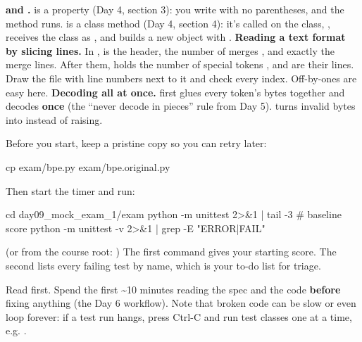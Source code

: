 \documentclass[10pt,a4paper]{article}
\begin{document}
\textbf{ and .}  is a property (Day 4, section 3): you write  with no parentheses, and the method runs.  is a class method (Day 4, section 4): it’s called on the class, , receives the class as , and builds a new object with .
\textbf{Reading a text format by slicing lines.} In ,  is the header,  the number of merges , and  exactly the  merge lines. After them,  holds the number of special tokens , and  are their lines. Draw the file with line numbers next to it and check every index. Off-by-ones are easy here.
\textbf{Decoding all at once.}  first glues every token’s bytes together and decodes \textbf{once} (the “never decode in pieces” rule from Day 5).  turns invalid bytes into  instead of raising.
\begin{tipbox}
Before you start, keep a pristine copy so you can retry later:
\end{tipbox}
\begin{shcode}
cp exam/bpe.py exam/bpe.original.py
\end{shcode}
Then start the timer and run:
\begin{shcode}
cd day09_mock_exam_1/exam
python -m unittest 2>&1 | tail -3              # baseline score
python -m unittest -v 2>&1 | grep -E "ERROR|FAIL"
\end{shcode}
(or from the course root: )
The first command gives your starting score. The second lists every failing test by name, which is your to-do list for triage.
\begin{tipbox}
Read  first. Spend the first \textasciitilde{}10 minutes reading the spec and the code \textbf{before} fixing anything (the Day 6 workflow). Note that broken code can be slow or even loop forever: if a test run hangs, press Ctrl-C and run test classes one at a time, e.g. .
\end{tipbox}
\end{document}
